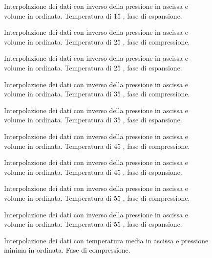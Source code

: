 \documentclass[italian,a4paper]{article}
\begin{document}
\begin{figure}[p]\caption{Interpolazione dei dati con inverso della pressione in ascissa e volume in ordinata. Temperatura di 15 \celsius, fase di espansione.}\label{15e}

\end{figure}
\begin{figure}[p]\caption{Interpolazione dei dati con inverso della pressione in ascissa e volume in ordinata. Temperatura di 25 \celsius, fase di compressione.}\label{25c}

\end{figure}
\begin{figure}[p]\caption{Interpolazione dei dati con inverso della pressione in ascissa e volume in ordinata. Temperatura di 25 \celsius, fase di espansione.}\label{25e}

\end{figure}
\begin{figure}[p]\caption{Interpolazione dei dati con inverso della pressione in ascissa e volume in ordinata. Temperatura di 35 \celsius, fase di compressione.}\label{35c}

\end{figure}
\begin{figure}[p]\caption{Interpolazione dei dati con inverso della pressione in ascissa e volume in ordinata. Temperatura di 35 \celsius, fase di espansione.}\label{35e}

\end{figure}
\begin{figure}[p]\caption{Interpolazione dei dati con inverso della pressione in ascissa e volume in ordinata. Temperatura di 45 \celsius, fase di compressione.}\label{45c}

\end{figure}
\begin{figure}[p]\caption{Interpolazione dei dati con inverso della pressione in ascissa e volume in ordinata. Temperatura di 45 \celsius, fase di espansione.}\label{45e}

\end{figure}
\begin{figure}[p]\caption{Interpolazione dei dati con inverso della pressione in ascissa e volume in ordinata. Temperatura di 55 \celsius, fase di compressione.}\label{55c}

\end{figure}
\begin{figure}[p]\caption{Interpolazione dei dati con inverso della pressione in ascissa e volume in ordinata. Temperatura di 55 \celsius, fase di espansione.}\label{55e}

\end{figure}
\begin{figure}[p]\caption{Interpolazione dei dati con temperatura media in ascissa e pressione minima in ordinata. Fase di compressione.}\label{t-pmincomp}

\end{figure}
\end{document}
